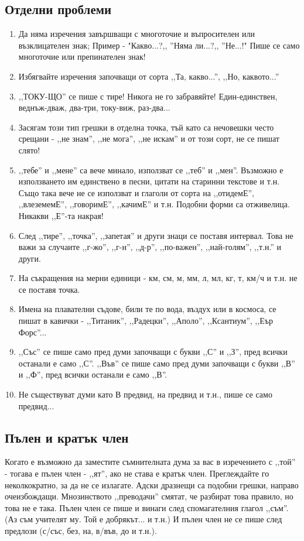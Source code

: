 \subsection{Отделни проблеми}
\begin{enumerate}
    \item Да няма изречения завършващи с многоточие и въпросителен или възклицателен знак; Пример - "Какво...?,, ''Няма ли...?,, ''Не...!" Пише се само многоточие или препинателен знак!
    \item Избягвайте изречения започващи от сорта ,,Та, какво...'', ,,Но, каквото...''
    \item ,,ТОКУ-ЩО'' се пише с тире! Никога не го забравяйте! Един-единствен, веднъж-дваж, два-три, току-виж, раз-два...
    \item Засягам този тип грешки в отделна точка, тъй като са нечовешки често срещани - ,,не знам'', ,,не мога'', ,,не искам'' и от този сорт, не се пишат слято!
    \item ,,тебе'' и ,,мене'' са вече минало, използват се ,,теб'' и ,,мен''. Възможно е използването им единствено в песни, цитати на старинни текстове и т.н. Също така вече не се използват и глаголи от сорта на ,,отидемЕ'', ,,влеземемЕ'', ,,говоримЕ'', ,,качимЕ'' и т.н. Подобни форми са отживелица. Никакви ,,Е''-та накрая!
    \item След ,,тире'', ,,точка'', ,,запетая'' и други знаци се поставя интервал. Това не важи за случаите ,,г-жо'', ,,г-н'', ,,д-р'', ,,по-важен'', ,,най-голям'', ,,т.н.'' и други.
    \item На съкращения на мерни единици - км, см, м, мм, л, мл, кг, т, км/ч и т.н. не се поставя точка.
    \item Имена на плавателни съдове, били те по вода, въздух или в космоса, се пишат в кавички - ,,Титаник'', ,,Радецки'', ,,Аполо'', ,,Ксантиум'', ,,Еър Форс''...

    \item,,Със'' се пише само пред думи започващи с букви ,,С'' и ,,З'', пред всички останали е само ,,С''. ,,Във'' се пише само пред думи започващи с букви ,,В'' и ,,Ф'', пред всички останали е само ,,В''.
    
    \item Не съществуват думи като В предвид, на предвид и т.н., пише се само предвид... 
\end{enumerate}

\subsection{Пълен и кратък член}
Когато е възможно да заместите съмнителната дума за вас в изречението с ,,той'' - тогава е пълен член - ,,ят'', ако не става е кратък член. Преглеждайте го неколкократно, за да не се излагате. Адски дразнещи са подобни грешки, направо очеизбождащи. Мнозинството ,,преводачи'' смятат, че разбират това правило, но това не е така. Пълен член се пише и винаги след спомагателния глагол ,,съм''. (Аз съм учителят му. Той е добрякът... и т.н.) И пълен член не се пише след предлози (с/със, без, на, в/във, до и т.н.).


